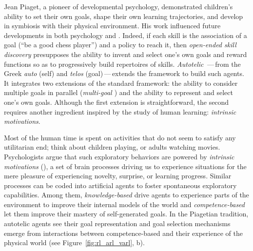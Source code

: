 Jean Piaget, a pioneer of developmental psychology, demonstrated children's ability to set their own goals, shape their own learning trajectories, and develop in symbiosis with their physical environment.\cite{piaget1952origins} His work influenced future developments in both psychology and \ai.\cite{dautenhahn_studying_1999} Indeed, if each skill is the association of a goal (\eg ``be a good chess player'') and a policy to reach it, then \textit{open-ended skill discovery} presupposes the ability to invent and select one's own goals and reward functions so as to progressively build repertoires of skills. \textit{Autotelic \textsl{\rl}}\,---\,from the Greek \textit{auto} (self) and \textit{telos} (goal)\,---\,extends the \rl framework to build such agents.\cite{colas2021intrinsically} It integrates two extensions of the standard \rl framework: the ability to consider multiple goals in parallel (\textit{multi-goal \textsl{\rl}}) and the ability to represent and select one's own goals. Although the first extension is straightforward,\cite{schaul_universal_2015} the second requires another ingredient inspired by the study of human learning: \textit{intrinsic motivations}. 

Most of the human time is spent on activities that do not seem to satisfy any utilitarian end; think about children playing, or adults watching movies. Psychologists argue that such exploratory behaviors are powered by \textit{intrinsic motivations} (\im), a set of brain processes driving us to experience situations for the mere pleasure of experiencing novelty, surprise, or learning progress.\cite{berlyne_curiosity_1966,  kidd_psychology_2015, gottlieb_towards_2018}
Similar processes can be coded into artificial agents to foster spontaneous exploratory capabilities.\cite{schmidhuber_curious_1991, barto_intrinsic_2005, oudeyer_intrinsic_2007} Among them, \textit{knowledge-based \textsl{\im}} drive agents to experience parts of the environment to improve their internal models of the world and \textit{competence-based \textsl{\im}} let them improve their mastery of self-generated goals.\cite{oudeyer_what_2009} In the Piagetian tradition, autotelic agents see their goal representation and goal selection mechanisms emerge from interactions between competence-based \im and their experience of the physical world (see Figure~\ref{fig:rl_arl_varl}, b).\cite{colas2021intrinsically}

